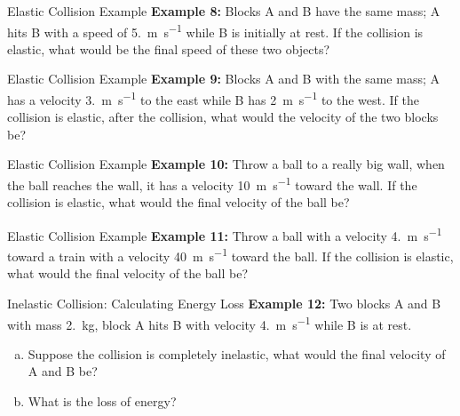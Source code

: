 \documentclass[12pt,compress,aspectratio=169]{beamer}
\begin{document}
\begin{frame}{Elastic Collision Example}
  \textbf{Example 8:} Blocks A and B have the same mass; A hits B with a speed
  of \SI{5.}{\metre\per\second} while B is initially at rest. If the collision
  is elastic, what would be the final speed of these two objects?
\end{frame}



\begin{frame}{Elastic Collision Example}
  \textbf{Example 9:} Blocks A and B with the same mass; A has a velocity
  \SI{3.}{\metre\per\second} to the east while B has \SI{2}{\metre\per\second}
  to the west. If the collision is elastic, after the collision, what would the
  velocity of the two blocks be?
\end{frame}



\begin{frame}{Elastic Collision Example}
  \textbf{Example 10:} Throw a ball to a really big wall, when the ball reaches
  the wall, it has a velocity \SI{10}{\metre\per\second} toward the wall. If
  the collision is elastic, what would the final velocity of the ball be?
\end{frame}



\begin{frame}{Elastic Collision Example}
  \textbf{Example 11:} Throw a ball with a velocity \SI{4.}{\metre\per\second}
  toward a train with a velocity \SI{40}{\metre\per\second} toward the ball.
  If the collision is elastic, what would the final velocity of the ball be?
\end{frame}


\begin{frame}{Inelastic Collision: Calculating Energy Loss}
  \textbf{Example 12:} Two blocks A and B with mass \SI{2.}{\kilo\gram}, block
  A hits B with velocity \SI{4.}{\metre\per\second} while B is at rest.
  \begin{enumerate}[(a)]
  \item Suppose the collision is completely inelastic, what would the final
    velocity of A and B be?
  \item What is the loss of energy?
  \end{enumerate}
\end{frame}
\end{document}

